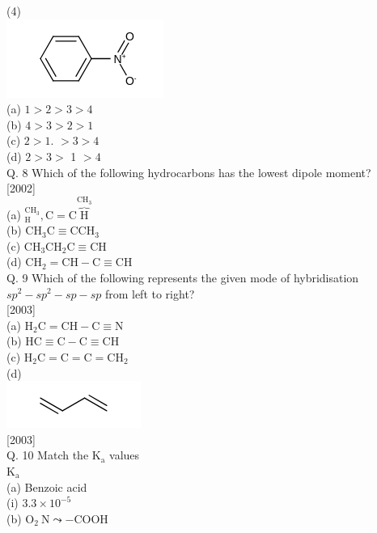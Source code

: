 \documentclass[10pt]{article}
\begin{document}
(4)\\
\includegraphics{smile-a6682d2d4a7609459110b658e146adb6d8efde2c}\\
(a) $1>2>3>4$\\
(b) $4>3>2>1$\\
(c) $2>1$. $>3>4$\\
(d) $2>3>$ 1 $>4$\\
Q. 8 Which of the following hydrocarbons has the lowest dipole moment?\\[0pt]
[2002]\\
(a) ${ }_{\mathrm{H}}^{\mathrm{CH}_{3}}, \mathrm{C}=\mathrm{C} \overbrace{\mathrm{H}}^{\mathrm{CH}_{3}}$\\
(b) $\mathrm{CH}_{3} \mathrm{C} \equiv \mathrm{CCH}_{3}$\\
(c) $\mathrm{CH}_{3} \mathrm{CH}_{2} \mathrm{C} \equiv \mathrm{CH}$\\
(d) $\mathrm{CH}_{2}=\mathrm{CH}-\mathrm{C} \equiv \mathrm{CH}$\\
Q. 9 Which of the following represents the given mode of hybridisation $s p^{2}-s p^{2}-s p-s p$ from left to right?\\[0pt]
[2003]\\
(a) $\mathrm{H}_{2} \mathrm{C}=\mathrm{CH}-\mathrm{C} \equiv \mathrm{N}$\\
(b) $\mathrm{HC} \equiv \mathrm{C}-\mathrm{C} \equiv \mathrm{CH}$\\
(c) $\mathrm{H}_{2} \mathrm{C}=\mathrm{C}=\mathrm{C}=\mathrm{CH}_{2}$\\
(d)\\
\includegraphics{smile-1127548614d8450df46560b65ba576a93fbada5a}\\[0pt]
[2003]\\
Q. 10 Match the $\mathrm{K}_{\mathrm{a}}$ values\\
$\mathrm{K}_{\mathrm{a}}$\\
(a) Benzoic acid\\
(i) $3.3 \times 10^{-5}$\\
(b) $\mathrm{O}_{2} \mathrm{~N} \leadsto-\mathrm{COOH}$\\
\end{document}
